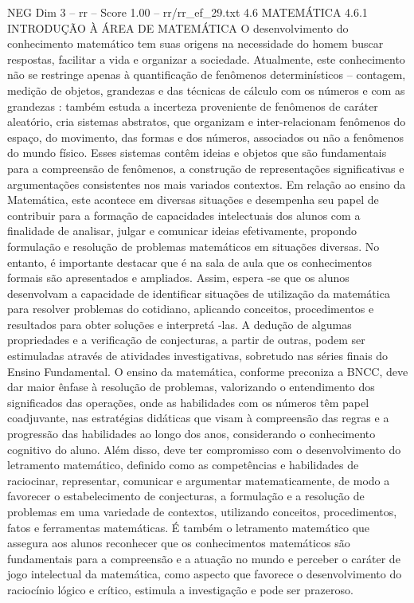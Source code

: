 \begin{textsample}{NEG Dim 3 – rr – Score 1.00 – rr/rr\_ef\_29.txt}  \label{ex:f3_neg_065}
4.6 MATEMÁTICA 4.6.1 INTRODUÇÃO À ÁREA DE MATEMÁTICA O desenvolvimento do conhecimento matemático tem suas origens na necessidade do homem buscar respostas, facilitar a vida e organizar a sociedade.
Atualmente, este conhecimento não se restringe apenas à quantificação de fenômenos determinísticos – contagem, medição de objetos, grandezas e das técnicas de cálculo com os números e com as grandezas : também estuda a incerteza proveniente de fenômenos de caráter aleatório, cria sistemas abstratos, que organizam e inter-relacionam fenômenos do espaço, do movimento, das formas e dos números, associados ou não a fenômenos do mundo físico.
Esses sistemas contêm ideias e objetos que são fundamentais para a compreensão de fenômenos, a construção de representações significativas e argumentações consistentes nos mais variados contextos.
Em relação ao ensino da Matemática, este acontece em diversas situações e desempenha seu papel de contribuir para a formação de capacidades intelectuais dos alunos com a finalidade de analisar, julgar e comunicar ideias efetivamente, propondo formulação e resolução de problemas matemáticos em situações diversas.
No entanto, é importante destacar que é na sala de aula que os conhecimentos formais são apresentados e ampliados.
Assim, espera -se que os alunos desenvolvam a capacidade de identificar situações de utilização da matemática para resolver problemas do cotidiano, aplicando conceitos, procedimentos e resultados para obter soluções e interpretá -las.
A dedução de algumas propriedades e a verificação de conjecturas, a partir de outras, podem ser estimuladas através de atividades investigativas, sobretudo nas séries finais do Ensino Fundamental.
O ensino da matemática, conforme preconiza a BNCC, deve dar maior ênfase à resolução de problemas, valorizando o entendimento dos significados das operações, onde as habilidades com os números têm papel coadjuvante, nas estratégias didáticas que visam à compreensão das regras e a progressão das habilidades ao longo dos anos, considerando o conhecimento cognitivo do aluno.
Além disso, deve ter compromisso com o desenvolvimento do letramento matemático, definido como as competências e habilidades de raciocinar, representar, comunicar e argumentar matematicamente, de modo a favorecer o estabelecimento de conjecturas, a formulação e a resolução de problemas em uma variedade de contextos, utilizando conceitos, procedimentos, fatos e ferramentas matemáticas.
É também o letramento matemático que assegura aos alunos reconhecer que os conhecimentos matemáticos são fundamentais para a compreensão e a atuação no mundo e perceber o caráter de jogo intelectual da matemática, como aspecto que favorece o desenvolvimento do raciocínio lógico e crítico, estimula a investigação e pode ser prazeroso.

\end{textsample}
